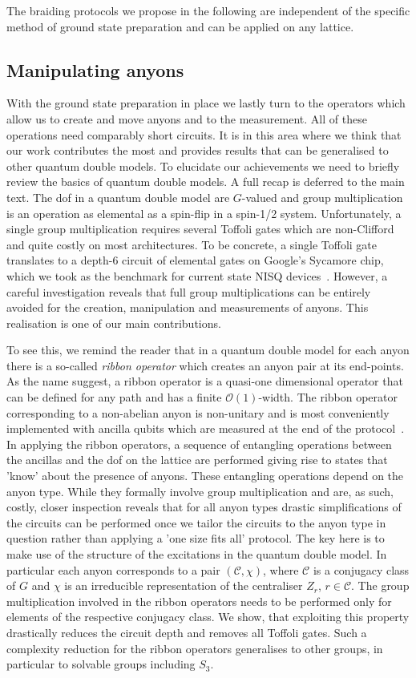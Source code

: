 \documentclass[a4paper,twocolumn,11pt]{quantumarticle}
\begin{document}
The braiding protocols we propose in the following are independent of the specific method of ground state preparation and can be applied on any lattice.


\subsection{Manipulating anyons}
With the ground state preparation in place we lastly turn to the operators which allow us to create and move anyons and to the measurement. All of these operations need comparably short circuits. It is in this area where we think that our work contributes the most and provides results that can be generalised to other quantum double models. To elucidate our achievements we need to briefly review the basics of quantum double models. A full recap is deferred to the main text. The dof in a quantum double model are $G$-valued and group multiplication is an operation as elemental as a spin-flip in a spin-1/2 system. Unfortunately, a single group multiplication requires several Toffoli gates which are non-Clifford and quite costly on most architectures. To be concrete, a single Toffoli gate translates to a depth-6 circuit of elemental gates on Google's Sycamore chip, which we took as the benchmark for current state NISQ devices~\cite{weber}. However, a careful investigation reveals that full group multiplications can be entirely avoided for the creation, manipulation and measurements of anyons. This realisation is one of our main contributions.

To see this, we remind the reader that in a quantum double model for each anyon there is a so-called \emph{ribbon operator} which creates an anyon pair at its end-points. As the name suggest, a ribbon operator is a quasi-one dimensional operator that can be defined for any path and has a finite $\mathcal O(1)$-width. The ribbon operator corresponding to a non-abelian anyon is non-unitary and is most conveniently implemented with ancilla qubits which are measured at the end of the protocol~\cite{Cirac}. In applying the ribbon operators, a sequence of entangling operations between the ancillas and the dof on the lattice are performed giving rise to states that 'know' about the presence of anyons. These entangling operations depend on the anyon type. While they formally involve group multiplication and are, as such, costly, closer inspection reveals that for all anyon types drastic simplifications of the circuits can be performed once we tailor the circuits to the anyon type in question rather than applying a 'one size fits all' protocol. The key here is to make use of the structure of the excitations in the quantum double model. In particular each anyon corresponds to a pair $(\mathcal C,\chi)$, where $\mathcal C$ is a conjugacy class of $G$ and $\chi$ is an irreducible representation of the centraliser $Z_r$, $r \in \mathcal C$. The group multiplication involved in the ribbon operators needs to be performed only for elements of the respective conjugacy class. We show, that exploiting this property drastically reduces the circuit depth and removes all Toffoli gates. Such a complexity reduction for the ribbon operators generalises to other groups, in particular to solvable groups including $S_3$. 
\end{document}
